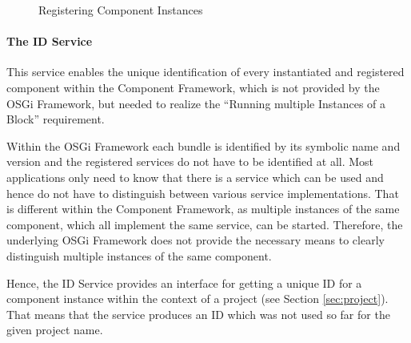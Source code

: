 \begin{figure}
	\centering
	\caption{Registering Component Instances}
	\label{fig:registering_component_instances}
\end{figure}

\paragraph{The ID Service}
\label{sec:id_service}
This service enables the unique identification of every instantiated and registered component
within the Component Framework, which is not provided by the OSGi Framework, but needed to realize
the ``Running multiple Instances of a Block'' requirement.

Within the OSGi Framework each bundle is identified by its symbolic name and version and the
registered services do not have to be identified at all. Most applications only need to know that
there is a service which can be used and hence do not have to distinguish between various service
implementations. That is different within the Component Framework, as multiple instances of the
same component, which all implement the same service, can be started. Therefore, the underlying OSGi
Framework does not provide the necessary means to clearly distinguish multiple instances of the
same component.

Hence, the ID Service provides an interface for getting a unique ID for a component instance within
the context of a project (see Section \ref{sec:project}). That means that the service produces an
ID which was not used so far for the given project name.

